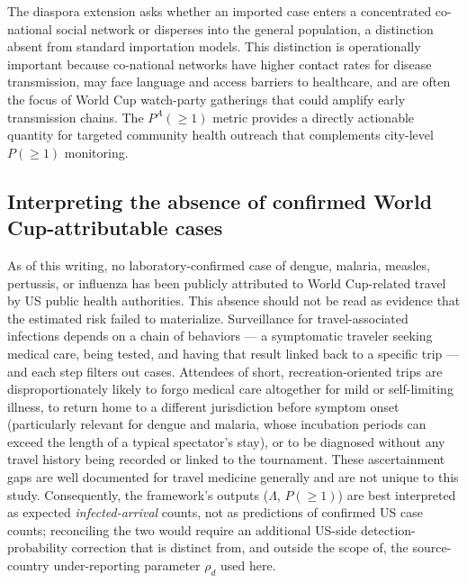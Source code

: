 \documentclass[12pt, a4paper]{article}
\begin{document}
The diaspora extension asks whether an imported case enters a concentrated co-national social network or disperses into the general population, a distinction absent from standard importation models. This distinction is operationally important because co-national networks have higher contact rates for disease transmission, may face language and access barriers to healthcare, and are often the focus of World Cup watch-party gatherings that could amplify early transmission chains. The $P^A(\geq 1)$ metric provides a directly actionable quantity for targeted community health outreach that complements city-level $P(\geq 1)$ monitoring.

\subsection*{Interpreting the absence of confirmed World Cup-attributable cases}

As of this writing, no laboratory-confirmed case of dengue, malaria, measles, pertussis, or influenza has been publicly attributed to World Cup-related travel by US public health authorities. This absence should not be read as evidence that the estimated risk failed to materialize. Surveillance for travel-associated infections depends on a chain of behaviors --- a symptomatic traveler seeking medical care, being tested, and having that result linked back to a specific trip --- and each step filters out cases. Attendees of short, recreation-oriented trips are disproportionately likely to forgo medical care altogether for mild or self-limiting illness, to return home to a different jurisdiction before symptom onset (particularly relevant for dengue and malaria, whose incubation periods can exceed the length of a typical spectator's stay), or to be diagnosed without any travel history being recorded or linked to the tournament. These ascertainment gaps are well documented for travel medicine generally and are not unique to this study. Consequently, the framework's outputs ($\Lambda$, $P(\geq 1)$) are best interpreted as expected \emph{infected-arrival} counts, not as predictions of confirmed US case counts; reconciling the two would require an additional US-side detection-probability correction that is distinct from, and outside the scope of, the source-country under-reporting parameter $\rho_d$ used here.
\end{document}
